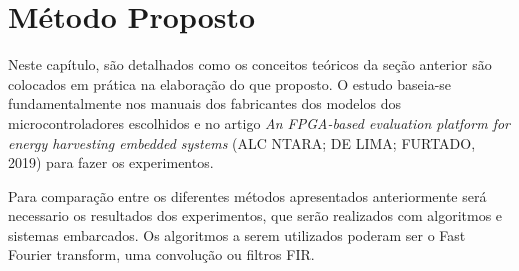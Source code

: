 \chapter{Método Proposto}\label{CAP3}
 Neste capítulo, são detalhados como os conceitos teóricos da seção anterior são colocados em prática na elaboração do que proposto. O estudo baseia-se fundamentalmente nos manuais dos fabricantes dos modelos dos microcontroladores escolhidos e no artigo {\itshape An FPGA-based evaluation platform for energy harvesting embedded systems} (ALC NTARA; DE LIMA; FURTADO, 2019) para fazer os experimentos.  

Para comparação entre os diferentes métodos apresentados anteriormente será necessario os resultados dos experimentos, que  serão realizados com algoritmos e sistemas embarcados. Os algoritmos a serem utilizados poderam ser o Fast Fourier transform, uma convolução ou filtros FIR. 


